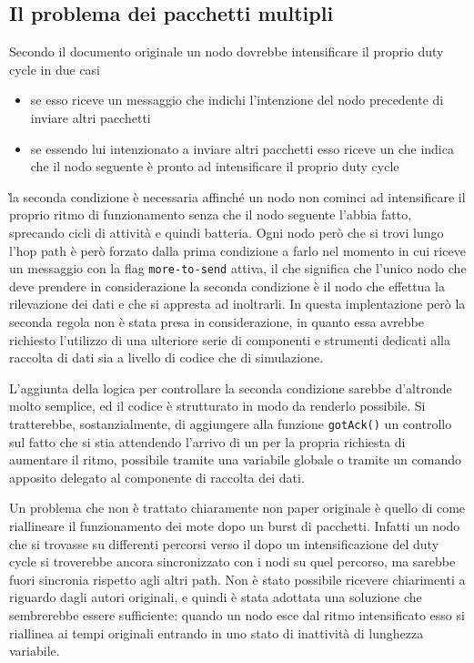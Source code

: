 \documentclass[twoside,11pt,a4paper,italian,openany]{book}
\begin{document}
\subsection{Il problema dei pacchetti multipli}
Secondo il documento originale un nodo dovrebbe intensificare il proprio duty cycle in due casi
\begin{itemize}
\item{se esso riceve un messaggio che indichi l'intenzione del nodo precedente di inviare altri 
pacchetti}
\item{se essendo lui intenzionato a inviare altri pacchetti esso riceve un \ack che indica che il nodo seguente è pronto ad intensificare il proprio duty cycle}
\end{itemize}
\`la seconda condizione è necessaria affinché un nodo non cominci ad intensificare il proprio 
ritmo di funzionamento senza che il nodo seguente l'abbia fatto, sprecando cicli di attività e 
quindi batteria. Ogni nodo però che si trovi lungo l'hop path è però forzato dalla prima 
condizione a farlo nel momento in cui riceve un messaggio con la flag \texttt{more-to-send} 
attiva, il che significa che l'unico nodo che deve prendere in considerazione la seconda 
condizione è il nodo che effettua la rilevazione dei dati e che si appresta ad inoltrarli. 
In questa implentazione però la seconda regola non è stata presa in considerazione, in quanto 
essa avrebbe richiesto l'utilizzo di una ulteriore serie di componenti e strumenti dedicati alla 
raccolta di dati sia a livello di codice che di simulazione.

L'aggiunta della logica per controllare la seconda condizione sarebbe d'altronde molto 
semplice, ed il codice è strutturato in modo da renderlo possibile.
Si tratterebbe, sostanzialmente, di aggiungere alla funzione \texttt{gotAck()} un controllo sul 
fatto che si stia attendendo l'arrivo di un \ack per la propria richiesta di aumentare il ritmo,
possibile tramite una variabile globale o tramite un comando apposito delegato al componente di 
raccolta dei dati.  

Un problema che non è trattato chiaramente non paper originale\cite{DMAC} è quello di come riallineare il funzionamento dei mote dopo un burst di pacchetti. 
Infatti un nodo che si trovasse su differenti percorsi verso il \sink dopo un intensificazione 
del duty cycle si troverebbe ancora sincronizzato con i nodi su quel percorso, ma sarebbe 
fuori sincronia rispetto agli altri path. 
Non è stato possibile ricevere chiarimenti a riguardo dagli autori originali, e quindi è stata 
adottata una soluzione che sembrerebbe essere sufficiente: quando un nodo esce dal ritmo 
intensificato esso si riallinea ai tempi originali entrando in uno stato di inattività di 
lunghezza variabile.
 
\end{document}
